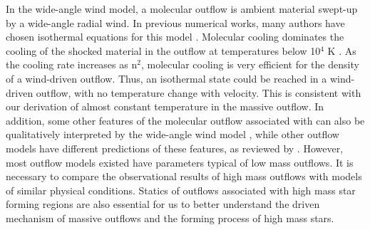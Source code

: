 In the wide-angle wind model, a molecular outflow is ambient material swept-up by a wide-angle radial wind. In previous numerical works, many authors have chosen isothermal equations for this model \citep{1996ApJ...472..211L,2001ApJ...557..429L}. Molecular cooling dominates the cooling of the shocked material in the outflow at temperatures below 10$^4$ K \citep{1997IAUS..182..181H}. As the cooling rate increases as n$^2$, molecular cooling is very efficient for the density of a wind-driven outflow. Thus, an isothermal state could be reached in a wind-driven outflow, with no temperature change with velocity. This is consistent with our derivation of almost constant temperature in the massive  outflow. In addition, some other features of the molecular outflow associated with  can also be qualitatively interpreted by the wide-angle wind model \citep{2009ApJ...696...66Q}, while other outflow models have different predictions of these features, as reviewed by \citet{2007prpl.conf..245A}. However, most outflow models existed have parameters typical of low mass outflows. It is necessary to compare the observational results of high mass outflows with models of similar physical conditions. Statics of outflows associated with high mass star forming regions are also essential for us to better understand the driven mechanism of massive outflows and the forming process of high mass stars.